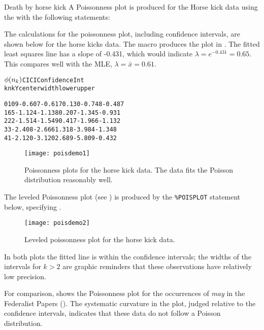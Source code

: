 \begin{Example}[horskick2]{Death by horse kick}
A Poissonness plot is produced for the Horse kick data
using the  with
the following statements:

The calculations for the poissonness plot, including confidence
intervals, are shown below for the horse kicks data.  The macro
produces the plot in
.
The fitted least squares line has a slope of -0.431, which would
indicate $\lambda = e^{-0.431} = 0.65$.  This compares well with the MLE,
$\lambda = \bar{x} = 0.61$.

\begin{alltt}
           \(\phi(n\sb{k})\)        CI       CI      Confidence Int
k    nk        Y       center   width     lower    upper

0   109   -0.607      -0.617    0.130    -0.748   -0.487
1    65   -1.124      -1.138    0.207    -1.345   -0.931
2    22   -1.514      -1.549    0.417    -1.966   -1.132
3     3   -2.408      -2.666    1.318    -3.984   -1.348
4     1   -2.120      -3.120    2.689    -5.809   -0.432
\end{alltt}
\begin{figure}[htb]
  \centering
  \texttt{[image: poisdemo1]}
  \caption[Poissonness plots for the horse kick data]{Poissonness plots
for the horse kick data.  The data fits the Poisson distribution
reasonably well.}\label{fig:poisdemo1}
\end{figure}

The leveled Poissonness plot (see ) is produced by the \texttt{\%POISPLOT} statement
below, specifying .

\begin{figure}[htb]
  \centering
  \texttt{[image: poisdemo2]}
  \caption[Leveled poissonness plot for the horse kick data]{Leveled poissonness plot for the horse kick data.}\label{fig:poisdemo2}
\end{figure}
In both plots the fitted line is within the confidence intervals;
the widths of the intervals for $k > 2$ are graphic reminders that these observations
have relatively low precision.

For comparison,  shows the Poissonness plot
for the occurrences of \emph{may} in the
Federalist Papers ().
The systematic curvature in the plot, judged relative to the confidence
intervals,
 indicates that these data do not follow a Poisson distribution.
\end{Example}

